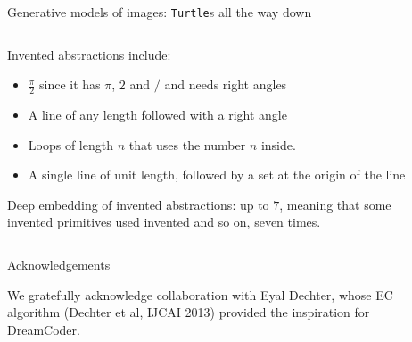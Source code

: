 \documentclass[final]{beamer}
\newlength{\onecolwid}
\newlength{\threecolwid}
\newcommand{\code}[1]{{\texttt{#1}}}
\newcommand{\pop}[1]{\textcolor{pop1}{#1}}
\newcommand{\popp}[1]{\textcolor{pop2}{#1}}
\begin{document}
\begin{frame}[t]
\begin{columns}[t]
\begin{column}{\threecolwid}
\begin{columns}[t,totalwidth=\threecolwid]
\begin{column}{\threecolwid}
\begin{block}{Generative models of images: \texttt{Turtle}s all the way down}
\begin{columns}[t,totalwidth=\threecolwid]
\begin{column}{\onecolwid}
  Invented abstractions include:
  \begin{itemize}
    \item $\frac\pi2$ since it has $\pi$, $2$ and $/$ and needs right angles
    \item A line of any length followed with a right angle
    \item Loops of length $n$ that uses the number $n$ inside.
    \item A single line of unit length, followed by a set at the origin of the
      line
  \end{itemize}

  Deep embedding of invented abstractions: up to $7$, %
  meaning that some invented primitives used invented and so on,
  seven times.

\end{column}
\end{columns}

\end{block}


\begin{block}{Acknowledgements}

  We gratefully acknowledge collaboration with Eyal Dechter, whose EC algorithm (Dechter et al, IJCAI 2013) provided the inspiration for DreamCoder.%

\end{block}





\end{column} %



\begin{column}{\onecolwid} %

\newcommand{\greenCode}[1]{{\footnotesize\popp{\code{#1}}}}
\newcommand{\blueCode}[1]{{\footnotesize\pop{\code{#1}}}}








\end{column}
\end{columns}
\end{column}
\end{columns}
\end{frame}
\end{document}
